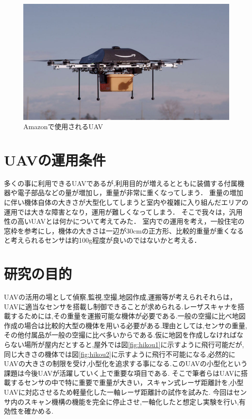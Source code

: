 \documentclass[12pt,oneside]{sotsuken_paper}
\begin{document}
\begin{figure}[H]
\begin{center}
\includegraphics[width=120mm]{img/Ama.jpg}
\end{center}
\caption{Amazonで使用されるUAV}
\label{fig:Ama}
\end{figure}

\section{UAVの運用条件}
多くの事に利用できるUAVであるが,利用目的が増えるとともに装備する付属機器や電子部品などの量が増加し，重量が非常に重くなってしまう．
重量の増加に伴い機体自体の大きさが大型化してしまうと室内や複雑に入り組んだエリアの運用では大きな障害となり，運用が難しくなってしまう．
そこで我々は，汎用性の高いUAVとは何かについて考えてみた．
室内での運用を考え，一般住宅の窓枠を参考にし，機体の大きさは一辺が30cmの正方形、比較的重量が重くなると考えられるセンサは約100g程度が良いのではないかと考える．




\section{研究の目的}
UAVの活用の場として偵察,監視,空撮,地図作成,運搬等が考えられそれらは，UAVに適当なセンサを搭載し制御できることが求められる.レーザスキャナを搭載するためには,その重量を運搬可能な機体が必要である.一般の空撮に比べ地図作成の場合は比較的大型の機体を用いる必要がある.理由としては,センサの重量,その他付属品が一般の空撮に比べ多いからである.仮に地図を作成しなければならない場所が屋内だとすると,屋外では図\ref{fig:hikou1}に示すように飛行可能だが,同じ大きさの機体では図\ref{fig:hikou2}に示すように飛行不可能になる,必然的にUAVの大きさの制限を受け,小型化を追求する事になる.このUAVの小型化という課題は今後UAVが活躍していく上で重要な項目である.
そこで筆者らはUAVに搭載するセンサの中で特に重要で重量が大きい，スキャン式レーザ距離計を,小型UAVに対応させるため軽量化した一軸レーザ距離計の試作を試みた.
今回はセンサ内のスキャン機構の機能を完全に停止させ,一軸化したと想定し実験を行い,有効性を確かめる.
\end{document}

